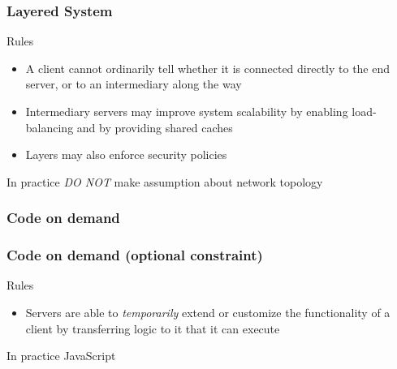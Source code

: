 \begin{frame}
	\frametitle{Layered System}
	
	\begin{block}{Rules}
		\begin{itemize}
			\item A client cannot ordinarily tell whether it is connected directly to the end server, or to an intermediary along the way
			\item Intermediary servers may improve system scalability by enabling load-balancing and by providing shared caches
			\item Layers may also enforce security policies
		\end{itemize}
	\end{block}
	
	\begin{exampleblock}{In practice}
		\emph{DO NOT} make assumption about network topology
	\end{exampleblock}

\end{frame}

\subsubsection{Code on demand}

\begin{frame}
	\frametitle{Code on demand (optional constraint)}
	
	\begin{block}{Rules}
		\begin{itemize}
			\item Servers are able to \emph{temporarily} extend or customize the functionality of a client by transferring logic to it that it can execute
		\end{itemize}
	\end{block}
	
	\begin{exampleblock}{In practice}
		JavaScript
	\end{exampleblock}

\end{frame}
